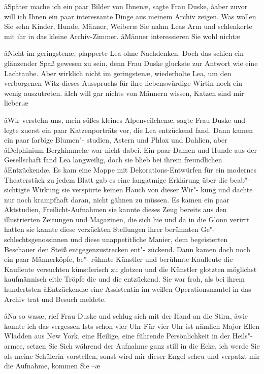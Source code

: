 \aa{}Später mache ich ein paar Bilder von Ihnen\ae{}, sagte Frau
Duske, \aa{}aber zuvor will ich Ihnen ein paar interessante
Dinge aus meinem Archiv zeigen. Was wollen Sie sehn\frag{}
Kinder, Hunde, Männer, Weiber\frag{}\ae{} Sie nahm Leas Arm
und schlenkerte mit ihr in das kleine Archiv-Zimmer. \aa{}Männer
interessieren Sie wohl nicht\frag{}\ae{}

\aa{}Nicht im geringsten\ae{}, plapperte Lea ohne Nachdenken. Doch
das schien ein glänzender Spaß gewesen zu sein, denn Frau
Duske gluckste zur Antwort wie eine Lachtaube. \aanah{}Aber wirklich
nicht im geringsten\ae{}, wiederholte Lea, um den verborgenen
Witz dieses Ausspruchs für ihre liebenswürdige Wirtin noch
ein wenig auszutreten. \aa{}Ich will gar nichts von Männern
wissen, Katzen sind mir lieber.\ae{}

\aa{}Wir verstehn uns, mein süßes kleines Alpenveilchen\ae{}, sagte
Frau Duske und legte zuerst ein paar Katzenporträts vor, die
Lea entzückend fand. Dann kamen ein paar farbige Blumen"-%
studien, Astern und Phlox und Dahlien, aber \aa{}Delphinium
Berghimmel\ae{} war nicht dabei. Ein paar Damen und Hunde
aus der Gesellschaft fand Lea langweilig, doch sie blieb bei
ihrem freundlichen \aa{}Entzückend\ae{}. Es kam eine Mappe mit
Dekorations-Entwürfen für ein modernes Theaterstück\semi{} zu
jedem Blatt gab es eine langatmige Erklärung über die beab"-%
sichtigte Wirkung\semi{} sie verspürte keinen Hauch von dieser Wir"-%
kung und dachte nur noch krampfhaft daran, nicht gähnen zu
müssen. Es kamen ein paar Aktstudien, Freilicht-Aufnahmen\semi{}
sie kannte dieses Zeug bereits aus den illustrierten Zeitungen
und Magazinen, die sich hie und da in die Glonn verirrt hatten\semi{}
sie kannte diese verzückten Stellungen ihrer berühmten Ge"-%
schlechtsgenossinnen und diese unappetitliche Manier, dem
begeisterten Beschauer den Steiß entgegenzustrecken\dopp{} ent"-%
zückend. Dann kamen doch noch ein paar Männerköpfe, be"-%
rühmte Künstler und berühmte Kaufleute\semi{} die Kaufleute
versuchten künstlerisch zu glotzen und die Künstler glotzten
möglichst kaufmännisch\semi{} eitle Tröpfe die und die\dopp{} entzückend.
Sie war froh, als bei ihrem hundertsten \aa{}Entzückend\ae{} eine
Assistentin im weißen Operationsmantel in das Archiv trat
und Besuch meldete.

\aa{}Na so was\ae{}, rief Frau Duske und schlug sich mit der Hand an
die Stirn, \aa{}wie konnte ich das vergessen\ausr{} Ists schon vier Uhr\frag{}
Für vier Uhr ist nämlich Major Ellen Wladden aus New
York, eine Heilige, eine führende Persönlichkeit in der Heils"-%
armee, setzen Sie Sich\eingriff{eS62-1}{Sich ] sich} während der Aufnahme ganz still in die
Ecke, ich werde Sie als meine Schülerin vorstellen, sonst
wird mir dieser Engel scheu und verpatzt mir die Aufnahme,
kommen Sie --\ae{}

